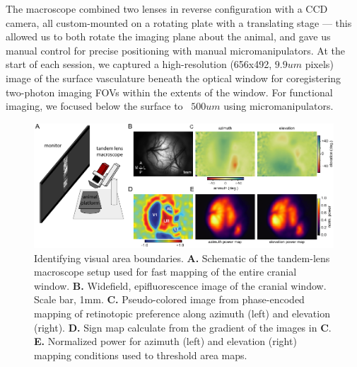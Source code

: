 The macroscope combined two lenses in reverse configuration with a CCD camera, all custom-mounted on a rotating plate with a translating stage --- this allowed us to both rotate the imaging plane about the animal, and gave us manual control for precise positioning with manual micromanipulators. At the start of each session, we captured a high-resolution (656x492, $9.9um$ pixels) image of the surface vasculature beneath the optical window for coregistering two-photon imaging FOVs within the extents of the window. For functional imaging, we focused below the surface to ~$500um$ using micromanipulators.

\begin{figure}
    \includegraphics[width=\textwidth]{figures/chapter_2/fig_2-5_retino_mapping/fig_2-5_retino_mapping.pdf}
    \vspace{.1in}
    \caption[Wide-field mapping]{Identifying visual area boundaries. \textbf{A.} Schematic of the tandem-lens macroscope setup used for fast mapping of the entire cranial window. \textbf{B.} Widefield, epifluorescence image of the cranial window. Scale bar, 1mm. \textbf{C.} Pseudo-colored image from phase-encoded mapping of retinotopic preference along azimuth (left) and elevation (right). \textbf{D.} Sign map calculate from the gradient of the images in \textbf{C}. \textbf{E.} Normalized power for azimuth (left) and elevation (right) mapping conditions used to threshold area maps. 
    \label{fig:retino_mapping}}
\end{figure}

